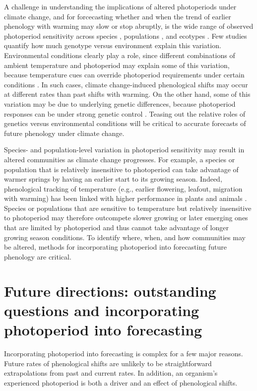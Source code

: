 \documentclass{article}
\begin{document}
 \par A challenge in understanding the implications of altered photoperiods under climate change, and for forcecasting whether and when the trend of earlier phenology with warming may slow or stop abruptly, is the wide range of observed photoperiod sensitivity across species \citep{flynn2018,Sanz-Perez:2009aa, zohner2016}, populations \citep{tanino2010}, and ecotypes \citep{Howe:1995aa}. Few studies quantify how much genotype versus environment explain this variation. Environmental conditions clearly play a role, since different combinations of ambient temperature and photoperiod may explain some of this variation, because temperature cues can override photoperiod requirements under certain conditions \citep [e.g.,][] {tanino2010}. In such cases, climate change-induced phenological shifts may occur at different rates than past shifts with warming. On the other hand, some of this variation may be due to underlying genetic differences, because photoperiod responses can be under strong genetic control \citep[][, see also Box 1]{bradshaw1995,keller2011,weih2004}. Teasing out the relative roles of genetics versus environmental conditions will be critical to accurate forecasts of future phenology under climate change.

\par Species- and population-level variation in photoperiod sensitivity may result in altered communities as climate change progresses. For example, a species or population that is relatively insensitive to photoperiod can take advantage of warmer springs by having an earlier start to its growing season. Indeed, phenological tracking of temperature (e.g., earlier flowering, leafout, migration with warming) has been linked with higher performance in plants and animals \citep{cleland2012,muir1994,willis2010}. Species or populations that are sensitive to temperature but relatively insensitive to photoperiod may therefore outcompete slower growing or later emerging ones that are limited by photoperiod and thus cannot take advantage of longer growing season conditions. To identify where, when, and how communities may be altered, methods for incorporating photoperiod into forecasting future phenology are critical. 
\section*{Future directions: outstanding questions and incorporating photoperiod into forecasting}
\par  Incorporating photoperiod into forecasting is complex for a few major reasons. Future rates of phenological shifts are unlikely to be straightforward extrapolations from past and current rates. In addition, an organism's experienced photoperiod is both a driver and an effect of phenological shifts. 
\end{document}
